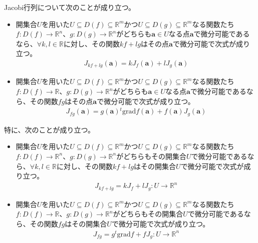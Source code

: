 \documentclass[dvipdfmx]{jsarticle}
\begin{document}
\begin{thm}\label{4.2.6.6} Jacobi行列について次のことが成り立つ。
\begin{itemize}
\item
  開集合$U$を用いた$U \subseteq D(f) \subseteq \mathbb{R}^{m}$かつ$U \subseteq D(g) \subseteq \mathbb{R}^{m}$なる関数たち$f:D(f) \rightarrow \mathbb{R}^{n}$、$g:D(g) \rightarrow \mathbb{R}^{n}$がどちらも$\mathbf{a} \in U$なる点$\mathbf{a}$で微分可能であるなら、$\forall k,l \in \mathbb{R}$に対し、その関数$kf + lg$はその点$\mathbf{a}$で微分可能で次式が成り立つ。
\begin{align*}
J_{kf + lg}\left( \mathbf{a} \right) = kJ_{f}\left( \mathbf{a} \right) + lJ_{g}\left( \mathbf{a} \right)
\end{align*}
\item
  開集合$U$を用いた$U \subseteq D(f) \subseteq \mathbb{R}^{m}$かつ$U \subseteq D(g) \subseteq \mathbb{R}^{m}$なる関数たち$f:D(f) \rightarrow \mathbb{R}$、$g:D(g) \rightarrow \mathbb{R}^{n}$がどちらも$\mathbf{a} \in U$なる点$\mathbf{a}$で微分可能であるなら、その関数$fg$はその点$\mathbf{a}$で微分可能で次式が成り立つ。
\begin{align*}
J_{fg}\left( \mathbf{a} \right) = g\left( \mathbf{a} \right){}^{t}\mathrm{grad}f\left( \mathbf{a} \right) + f\left( \mathbf{a} \right)J_{g}\left( \mathbf{a} \right)
\end{align*}
\end{itemize}\par
特に、次のことが成り立つ。
\begin{itemize}
\item
  開集合$U$を用いた$U \subseteq D(f) \subseteq \mathbb{R}^{m}$かつ$U \subseteq D(g) \subseteq \mathbb{R}^{m}$なる関数たち$f:D(f) \rightarrow \mathbb{R}^{n}$、$g:D(g) \rightarrow \mathbb{R}^{n}$がどちらもその開集合$U$で微分可能であるなら、$\forall k,l \in \mathbb{R}$に対し、その関数$kf + lg$はその開集合$U$で微分可能で次式が成り立つ。
\begin{align*}
J_{kf + lg} = kJ_{f} + lJ_{g}:U \rightarrow \mathbb{R}^{n}
\end{align*}
\item
  開集合$U$を用いた$U \subseteq D(f) \subseteq \mathbb{R}^{m}$かつ$U \subseteq D(g) \subseteq \mathbb{R}^{m}$なる関数たち$f:D(f) \rightarrow \mathbb{R}$、$g:D(g) \rightarrow \mathbb{R}^{n}$がどちらもその開集合$U$で微分可能であるなら、その関数$fg$はその開集合$U$で微分可能で次式が成り立つ。
\begin{align*}
J_{fg} = g{}^{t}\mathrm{grad}f + fJ_{g}:U \rightarrow \mathbb{R}^{n}
\end{align*}
\end{itemize}
\end{thm}
\end{document}

